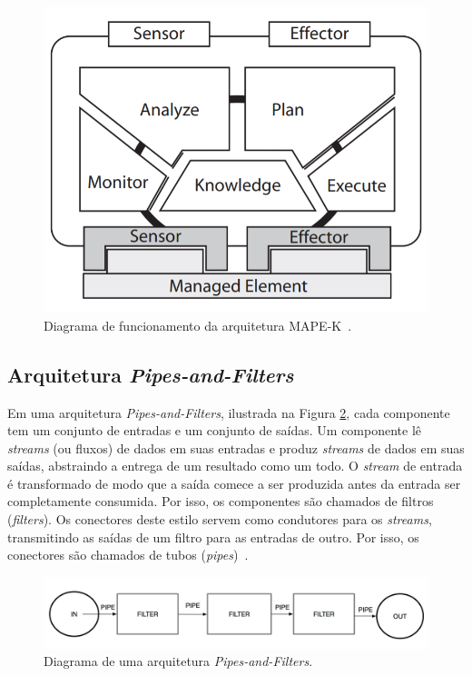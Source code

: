 \documentclass[portugues]{ic-tese}
\begin{document}
\begin{figure}[H]
\centering
\includegraphics[scale=0.5]{images/MAPE-K.png}
\caption {Diagrama de funcionamento da arquitetura MAPE-K~\citep{Abbas_2010}.}
\label{fig:MAPEK}
\end{figure}

\subsection{Arquitetura \textit{Pipes-and-Filters}}

Em uma arquitetura \textit{Pipes-and-Filters}, ilustrada na Figura \ref{fig:PipeandFilter}, cada componente tem um conjunto de entradas e um conjunto de saídas. Um componente lê \textit{streams} (ou fluxos) de dados em suas entradas e produz \textit{streams} de dados em suas saídas, abstraindo a entrega de um resultado como um todo. O \textit{stream} de entrada é transformado de modo que a saída comece a ser produzida antes da entrada ser completamente consumida. Por isso, os componentes são chamados de filtros (\textit{filters}). Os conectores deste estilo servem como condutores para os \textit{streams}, transmitindo as saídas de um filtro para as entradas de outro. Por isso, os conectores são chamados de tubos (\textit{pipes})~\citep{Garlan_1993}.

\begin{figure}[h]
\centering
\includegraphics[scale=0.25]{images/PipeandFilter.png}
\caption {Diagrama de uma arquitetura \textit{Pipes-and-Filters}.}
\label{fig:PipeandFilter}
\end{figure}
\end{document}
